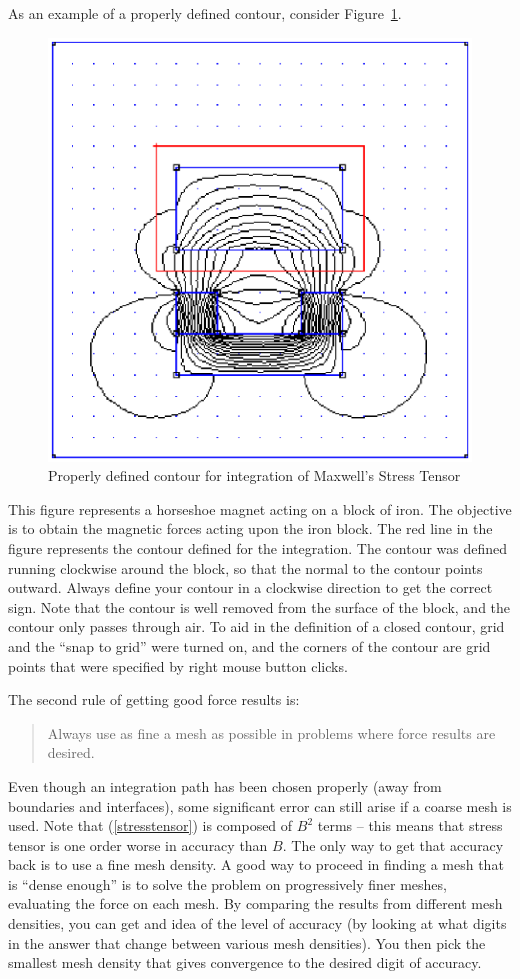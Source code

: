 \documentclass[12pt]{report}
\begin{document}
As an example of a properly defined contour, consider
Figure~\ref{mcont1}.
\begin{figure}
\centerline{\includegraphics{mcontour1.ps}}
\caption{Properly defined contour for integration of Maxwell's
Stress Tensor}
\label{mcont1}
\end{figure}
This figure represents a horseshoe magnet acting on a block of
iron.  The objective is to obtain the magnetic forces acting upon
the iron block.  The red line in the figure represents the contour
defined for the integration.  The contour was defined running
clockwise around the block, so that the normal to the contour
points outward.  Always define your contour in a clockwise
direction to get the correct sign.  Note that the contour is well
removed from the surface of the block, and the contour only passes
through air.  To aid in the definition of a closed contour, grid
and the ``snap to grid'' were turned on, and the corners of the
contour are grid points that were specified by right mouse button
clicks.

The second rule of getting good force results is:
\begin{quote}
Always use as fine a mesh as possible in problems where force
results are desired.
\end{quote}
Even though an integration path has been chosen properly (away from
boundaries and interfaces), some significant error can still arise
if a coarse mesh is used.  Note that (\ref{stresstensor}) is
composed of $B^2$ terms -- this means that stress tensor is one
order worse in accuracy than $B$.  The only way to get that
accuracy back is to use a fine mesh density.  A good way to proceed
in finding a mesh that is ``dense enough'' is to solve the problem
on progressively finer meshes, evaluating the force on each mesh.
By comparing the results from different mesh densities, you can get
and idea of the level of accuracy (by looking at what digits in the
answer that change between various mesh densities). You then pick
the smallest mesh density that gives convergence to the desired
digit of accuracy.
\end{document}
